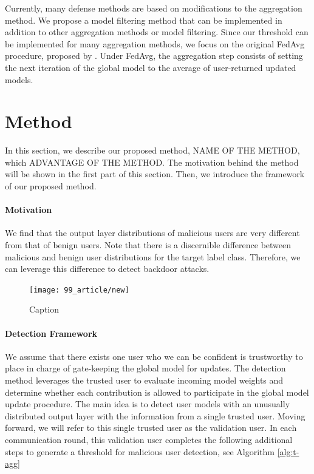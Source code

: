 \documentclass{article} %
\newcommand{\yli}[1]{{\color{cyan}#1}}
\begin{document}
Currently, many defense methods are based on modifications to the aggregation method. We propose a model filtering method that can be implemented in addition to other aggregation methods or model filtering. Since our threshold can be implemented for many aggregation methods, we focus on the original FedAvg procedure, proposed by \cite{fedavg}. Under FedAvg, the aggregation step consists of setting the next iteration of the global model to the average of user-returned updated models. 


%
\section{Method}

\yli{In this section, we describe our proposed method, NAME OF THE METHOD, which ADVANTAGE OF THE METHOD. The motivation behind the method will be shown in the first part of this section. Then, we introduce the framework of our proposed method.}

\paragraph{Motivation}

We find that the output layer distributions of malicious users are very different from that of benign users. Note that there is a discernible difference between malicious and benign user distributions for the target label class. Therefore, we can leverage this difference to detect backdoor attacks.

\begin{figure}[H]
    \centering
    \texttt{[image: 99\_article/new]}
    \caption{Caption}
    \label{fig:my_label}
\end{figure}

\paragraph{Detection Framework}

We assume that there exists one user who we can be confident is trustworthy to place in charge of gate-keeping the global model for updates. The detection method leverages the trusted user to evaluate incoming model weights and determine whether each contribution is allowed to participate in the global model update procedure. The main idea is to detect user models with an unusually distributed output layer with the information from a single trusted user. Moving forward, we will refer to this single trusted user as the validation user. In each communication round, this validation user completes the following additional steps to generate a threshold for malicious user detection, see Algorithm \ref{alg:t-agg}
\end{document}
